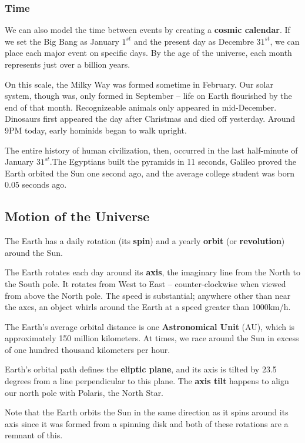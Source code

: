 \subsubsection{Time}
We can also model the time between events by creating a {\bf cosmic calendar}. If we set the Big Bang as January $1^{st}$ and the present day as Decembre $31^{st}$, we can place each major event on specific days. By the age of the universe, each month represents just over a billion years.

On this scale, the Milky Way was formed sometime in February. Our solar system, though was, only formed in September -- life on Earth flourished by the end of that month. Recognizeable animals only appeared in mid-December. Dinosaurs first appeared the day after Christmas and died off yesterday. Around 9PM today, early hominids began to walk upright.

The entire history of human civilization, then, occurred in the last half-minute of January $31^{st}$.The Egyptians built the pyramids in 11 seconds, Galileo proved the Earth orbited the Sun one second ago, and the average college student was born 0.05 seconds ago.

\subsection{Motion of the Universe}
The Earth has a daily rotation (its {\bf spin}) and a yearly {\bf orbit} (or {\bf revolution}) around the Sun.

The Earth rotates each day around its {\bf axis}, the imaginary line from the North to the South pole. It rotates from West to East -- counter-clockwise when viewed from above the North pole. The speed is substantial; anywhere other than near the axes, an object whirls around the Earth at a speed greater than 1000km/h.

The Earth's average orbital distance is one {\bf Astronomical Unit} (AU), which is approximately 150 million kilometers. At times, we race around the Sun in excess of one hundred thousand kilometers per hour.

Earth's orbital path defines the {\bf eliptic plane}, and its axis is tilted by 23.5 degrees from a line perpendicular to this plane. The {\bf axis tilt} happens to align our north pole with Polaris, the North Star.

Note that the Earth orbits the Sun in the same direction as it spins around its axis since it was formed from a spinning disk and both of these rotations are a remnant of this.

